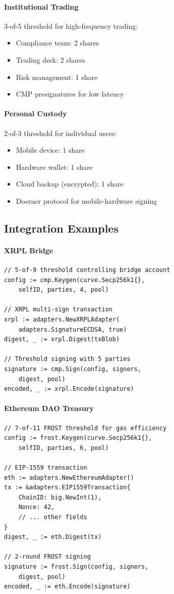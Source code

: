 \paragraph{Institutional Trading} 3-of-5 threshold for high-frequency trading:
\begin{itemize}
\item Compliance team: 2 shares
\item Trading desk: 2 shares
\item Risk management: 1 share
\item CMP presignatures for low latency
\end{itemize}

\paragraph{Personal Custody} 2-of-3 threshold for individual users:
\begin{itemize}
\item Mobile device: 1 share
\item Hardware wallet: 1 share
\item Cloud backup (encrypted): 1 share
\item Doerner protocol for mobile-hardware signing
\end{itemize}

\subsection{Integration Examples}

\paragraph{XRPL Bridge}
\begin{verbatim}
// 5-of-9 threshold controlling bridge account
config := cmp.Keygen(curve.Secp256k1{},
    selfID, parties, 4, pool)

// XRPL multi-sign transaction
xrpl := adapters.NewXRPLAdapter(
    adapters.SignatureECDSA, true)
digest, _ := xrpl.Digest(txBlob)

// Threshold signing with 5 parties
signature := cmp.Sign(config, signers,
    digest, pool)
encoded, _ := xrpl.Encode(signature)
\end{verbatim}

\paragraph{Ethereum DAO Treasury}
\begin{verbatim}
// 7-of-11 FROST threshold for gas efficiency
config := frost.Keygen(curve.Secp256k1{},
    selfID, parties, 6, pool)

// EIP-1559 transaction
eth := adapters.NewEthereumAdapter()
tx := &adapters.EIP1559Transaction{
    ChainID: big.NewInt(1),
    Nonce: 42,
    // ... other fields
}
digest, _ := eth.Digest(tx)

// 2-round FROST signing
signature := frost.Sign(config, signers,
    digest, pool)
encoded, _ := eth.Encode(signature)
\end{verbatim}

